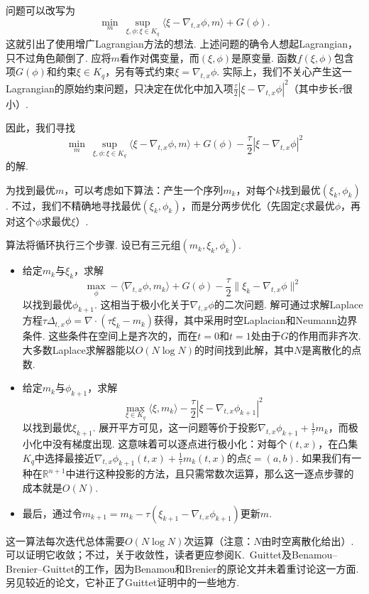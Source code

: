 问题可以改写为
\[
\min_m\ \sup_{\xi,\phi:\xi\in K_q}
\langle\xi-\nabla_{t,x}\phi,m\rangle+G(\phi).
\]
这就引出了使用增广Lagrangian方法的想法. 上述问题的确令人想起Lagrangian，只不过角色颠倒了. 应将$m$看作对偶变量，而$(\xi,\phi)$是原变量. 函数$f(\xi,\phi)$包含项$G(\phi)$和约束$\xi\in K_q$，另有等式约束$\xi=\nabla_{t,x}\phi$. 实际上，我们不关心产生这一Lagrangian的原始约束问题，只决定在优化中加入项$\frac\tau2|\xi-\nabla_{t,x}\phi|^2$（其中步长$\tau$很小）.

因此，我们寻找
\[
\min_m\ \sup_{\xi,\phi:\xi\in K_q}
\langle\xi-\nabla_{t,x}\phi,m\rangle+G(\phi)
-\frac\tau2|\xi-\nabla_{t,x}\phi|^2
\]
的解.

为找到最优$m$，可以考虑如下算法：产生一个序列$m_k$，对每个$k$找到最优$(\xi_k,\phi_k)$. 不过，我们不精确地寻找最优$(\xi_k,\phi_k)$，而是分两步优化（先固定$\xi$求最优$\phi$，再对这个$\phi$求最优$\xi$）.

算法将循环执行三个步骤. 设已有三元组$(m_k,\xi_k,\phi_k)$.
\begin{itemize}
\item 给定$m_k$与$\xi_k$，求解
\[
\max_\phi -\langle\nabla_{t,x}\phi,m_k\rangle+G(\phi)
-\frac\tau2\|\xi_k-\nabla_{t,x}\phi\|^2
\]
以找到最优$\phi_{k+1}$. 这相当于极小化关于$\nabla_{t,x}\phi$的二次问题. \label{idx:i110-p224}
解可通过求解Laplace方程$\tau\Delta_{t,x}\phi=\nabla\cdot(\tau\xi_k-m_k)$获得，其中采用时空Laplacian和Neumann边界条件. 这些条件在空间上是齐次的，而在$t=0$和$t=1$处由于$G$的作用而非齐次. 大多数Laplace求解器能以$O(N\log N)$的时间找到此解，其中$N$是离散化的点数.
\item 给定$m_k$与$\phi_{k+1}$，求解
\[
\max_{\xi\in K_q}\langle\xi,m_k\rangle
-\frac\tau2|\xi-\nabla_{t,x}\phi_{k+1}|^2
\]
以找到最优$\xi_{k+1}$. 展开平方可见，这一问题等价于投影$\nabla_{t,x}\phi_{k+1}+\frac1\tau m_k$，而极小化中没有梯度出现. 这意味着可以逐点进行极小化：对每个$(t,x)$，在凸集$K_q$中选择最接近$\nabla_{t,x}\phi_{k+1}(t,x)+\frac1\tau m_k(t,x)$的点$\xi=(a,b)$. 如果我们有一种在$\mathbb R^{n+1}$中进行这种投影的方法，且只需常数次运算，那么这一逐点步骤的成本就是$O(N)$.
\item 最后，通过令$m_{k+1}=m_k-\tau(\xi_{k+1}-\nabla_{t,x}\phi_{k+1})$更新$m$.
\end{itemize}
这一算法每次迭代总体需要$O(N\log N)$次运算（注意：$N$由时空离散化给出）. 可以证明它收敛；不过，关于收敛性，读者更应参阅K.~Guittet及Benamou--Brenier--Guittet的工作\cite{b36,b188,b189}，因为Benamou和Brenier的原论文并未着重讨论这一方面. 另见较近的论文\cite{b194}，它补正了Guittet证明中的一些地方.

